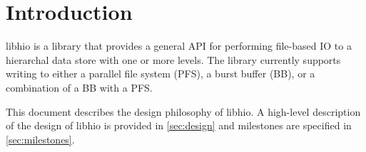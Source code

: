 \section{Introduction}

libhio is a library that provides a general API for performing
file-based IO to a hierarchal data store with one or more levels. The
library currently supports writing to either a parallel file system
(PFS), a burst buffer (BB), or a combination of a BB with a PFS.

This document describes the design philosophy of libhio. A high-level
description of the design of libhio is provided in \ref{sec:design}
and milestones are specified in \ref{sec:milestones}.
